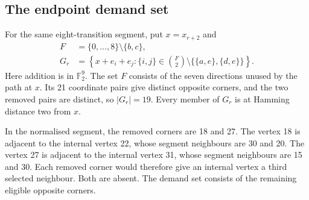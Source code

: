 \documentclass[11pt,a4paper]{article}
\theoremstyle{definition}
\theoremstyle{remark}
\begin{document}
\subsection{The endpoint demand set}
For the same eight-transition segment, put $x=x_{r+2}$ and
\[
\begin{aligned}
F&=\{0,\ldots,8\}\setminus\{b,c\},\\
G_r&=\left\{x+e_i+e_j:
\{i,j\}\in\binom F2\setminus\bigl\{\{a,e\},\{d,e\}\bigr\}\right\}.
\end{aligned}
\]
Here addition is in $\mathbb F_2^9$. The set $F$ consists of the seven directions unused by the path at $x$. Its 21 coordinate pairs give distinct opposite corners, and the two removed pairs are distinct, so $|G_r|=19$. Every member of $G_r$ is at Hamming distance two from $x$.

In the normalised segment, the removed corners are 18 and 27. The vertex 18 is adjacent to the internal vertex 22, whose segment neighbours are 30 and 20. The vertex 27 is adjacent to the internal vertex 31, whose segment neighbours are 15 and 30. Each removed corner would therefore give an internal vertex a third selected neighbour. Both are absent. The demand set consists of the remaining eligible opposite corners.
\end{document}

